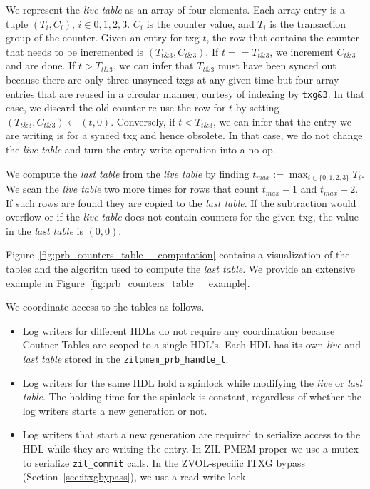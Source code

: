 \documentclass[12pt,a4paper,twoside]{book}
\begin{document}
We represent the \textit{live table} as an array of four elements.
Each array entry is a tuple $(T_i, C_i)$, $i \in {0,1,2,3}$.
$C_i$ is the counter value, and $T_i$ is the transaction group of the counter.
Given an entry for txg $t$, the row that contains the counter that needs to be incremented is $(T_{t\&3}, C_{t\&3})$.
If $t == T_{t\&3}$, we increment $C_{t\&3}$ and are done.
If $t > T_{t\&3}$, we can infer that $T_{t\&3}$ must have been synced out because there are only three unsynced txgs at any given time but four array entries that are reused in a circular manner, curtesy of indexing by \lstinline{txg&3}.
In that case, we discard the old counter re-use the row for $t$ by setting $(T_{t\&3}, C_{t\&3}) \leftarrow (t, 0)$.
Conversely, if $t < T_{t\&3}$, we can infer that the entry we are writing is for a synced txg and hence obsolete.
In that case, we do not change the \textit{live table} and turn the entry write operation into a no-op.

We compute the \textit{last table} from the \textit{live table} by finding $t_{max} := \max_{i \in \{0,1,2,3\}} T_i$.
We scan the \textit{live table} two more times for rows that count $t_{max}-1$ and $t_{max}-2$.
If such rows are found they are copied to the \textit{last table}.
If the subtraction would overflow or if the \textit{live table} does not contain counters for the given txg, the value in the \textit{last table} is $(0,0)$.

Figure~\ref{fig:prb_counters_table__computation} contains a visualization of the tables and the algoritm used to compute the \textit{last table}.
We provide an extensive example in Figure~\ref{fig:prb_counters_table__example}.

We coordinate access to the tables as follows.
\begin{itemize}[noitemsep]
\item Log writers for different HDLs do not require any coordination because Coutner Tables are scoped to a single HDL's.
    Each HDL has its own \textit{live} and \textit{last table} stored in the \lstinline{zilpmem_prb_handle_t}.
\item Log writers for the same HDL hold a spinlock while modifying the \textit{live} or \textit{last table}.
    The holding time for the spinlock is constant, regardless of whether the log writers starts a new generation or not.
\item Log writers that start a new generation are required to serialize access to the HDL while they are writing the entry.
    In ZIL-PMEM proper we use a mutex to serialize \lstinline{zil_commit} calls.
    In the ZVOL-specific ITXG bypass (Section~\ref{sec:itxgbypass}), we use a read-write-lock.
\end{itemize}
\end{document}
